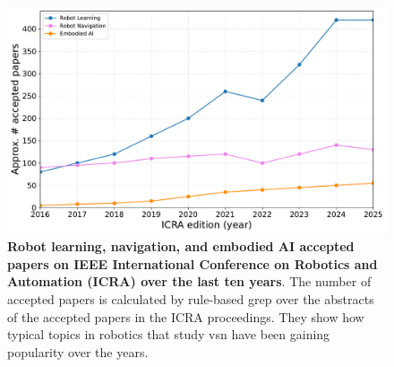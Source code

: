 \begin{figure}
    \centering
    \includegraphics[width=\textwidth]{figures/introduction/icra_papers}
    \caption[Robot learning, navigation, and embodied AI accepted papers on IEEE International Conference on Robotics and Automation (ICRA) over the last ten years]{\textbf{Robot learning, navigation, and embodied AI accepted papers on IEEE International Conference on Robotics and Automation (ICRA) over the last ten years}. The number of accepted papers is calculated by rule-based grep over the abstracts of the accepted papers in the ICRA proceedings. They show how typical topics in robotics that study \acrshort{vsn} have been gaining popularity over the years.}
    \label{fig:icra_papers}
\end{figure}

